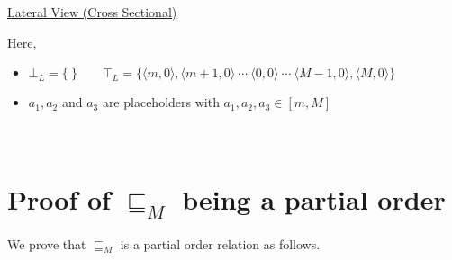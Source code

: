 \documentclass[final,3p, review, times]{util/elsarticle}
\begin{document}
\centerline{\underline{\Large{Lateral View (Cross Sectional)}}}

Here,
\begin{itemize}
  \item $\bot_L=\big\{\ \big\}\qquad\top_L=\big\{\langle m,0\rangle,\langle m+1,0\rangle\ \cdots\ \langle 0,0\rangle\ \cdots\ \langle M-1,0\rangle,\langle M,0\rangle\big\}$
  \item $a_1,a_2$ and $a_3$ are placeholders with $a_1,a_2,a_3\in[m,M]$
\end{itemize}















\section{\\Proof of $\sqsubseteq_M$ being a partial order}
\label{app:interval_partial}

We prove that $\sqsubseteq_M$ is a partial order relation as follows.
\end{document}
